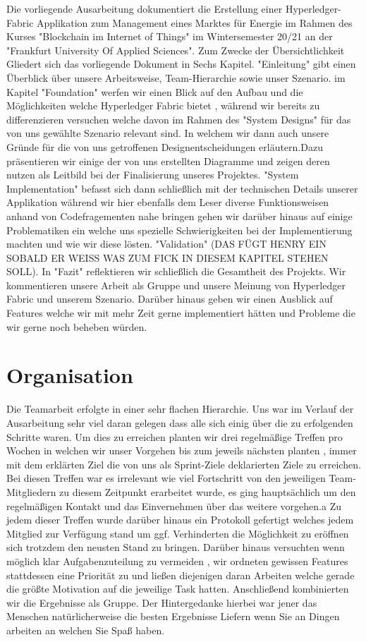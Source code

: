 Die vorliegende Ausarbeitung dokumentiert die  Erstellung einer Hyperledger-Fabric Applikation zum Management eines Marktes für Energie im Rahmen des Kurses "Blockchain im Internet of Things" im Wintersemester 20/21 an der "Frankfurt University Of Applied Sciences". Zum Zwecke der Übersichtlichkeit Gliedert sich das vorliegende Dokument in Sechs Kapitel. "Einleitung" gibt einen Überblick über unsere Arbeitsweise, Team-Hierarchie sowie unser Szenario. im Kapitel "Foundation" werfen wir einen Blick auf den Aufbau und die Möglichkeiten welche Hyperledger Fabric bietet , während wir bereits zu differenzieren versuchen welche davon im Rahmen des "System Designs" für das von uns gewählte Szenario relevant sind. In welchem wir dann auch unsere Gründe für die von uns getroffenen Designentscheidungen erläutern.Dazu präsentieren wir einige der von uns erstellten Diagramme und zeigen deren nutzen als Leitbild bei der Finalisierung unseres Projektes. "System Implementation" befasst sich dann schließlich mit der technischen Details unserer Applikation während wir hier ebenfalls dem Leser diverse Funktionsweisen anhand von Codefragementen nahe bringen gehen wir darüber hinaus auf einige Problematiken ein welche uns spezielle Schwierigkeiten bei der Implementierung machten und wie wir diese lösten. "Validation" (DAS FÜGT HENRY EIN SOBALD ER WEISS WAS ZUM FICK IN DIESEM KAPITEL STEHEN SOLL). In "Fazit" reflektieren wir schließlich die Gesamtheit des Projekts. Wir kommentieren unsere Arbeit als Gruppe und unsere Meinung von Hyperledger Fabric und unserem Szenario. Darüber hinaus geben wir einen Ausblick auf Features welche wir mit mehr Zeit gerne implementiert hätten und Probleme die wir gerne noch beheben würden.

\section{Organisation}

Die Teamarbeit erfolgte in einer sehr flachen Hierarchie. Uns war im Verlauf der Ausarbeitung sehr viel daran gelegen dass alle sich einig über die zu erfolgenden Schritte  waren. Um dies zu erreichen planten wir drei regelmäßige Treffen pro Wochen in welchen wir unser Vorgehen bis zum jeweils nächsten planten , immer mit dem erklärten Ziel die von uns als Sprint-Ziele deklarierten Ziele zu erreichen. Bei diesen Treffen war es irrelevant wie viel Fortschritt von den jeweiligen Team-Mitgliedern zu diesem Zeitpunkt erarbeitet wurde, es ging hauptsächlich um den regelmäßigen Kontakt und das Einvernehmen über das weitere vorgehen.a Zu jedem dieser Treffen wurde darüber hinaus ein Protokoll gefertigt welches jedem Mitglied zur Verfügung stand um ggf. Verhinderten die Möglichkeit zu eröffnen sich trotzdem den neusten Stand zu bringen. Darüber hinaus versuchten wenn möglich klar Aufgabenzuteilung zu vermeiden , wir ordneten gewissen Features stattdessen eine Priorität zu und ließen diejenigen daran Arbeiten welche gerade die größte Motivation auf die jeweilige Task hatten. Anschließend kombinierten wir die Ergebnisse  als Gruppe. Der Hintergedanke hierbei war jener das Menschen natürlicherweise die besten Ergebnisse Liefern wenn Sie an Dingen arbeiten an welchen Sie Spaß haben.


